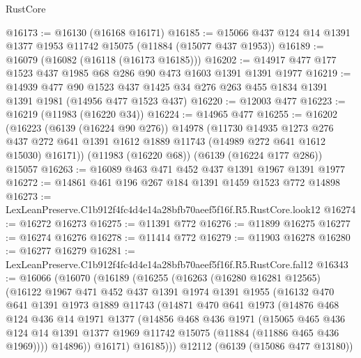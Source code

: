 \begin{lexlean}{RustCore}
\begin{coremodule}
@16173 := @16130 (@16168 @16171)
@16185 := @15066 @437 @124 @14 @1391 @1377 @1953 @11742 @15075 (@11884 (@15077 @437 @1953))
@16189 := @16079 (@16082 (@16118 (@16173 @16185)))
@16202 := @14917 @477 @177 @1523 @437 @1985 @68 @286 @90 @473 @1603 @1391 @1391 @1977
@16219 := @14939
    @477
    @90
    @1523
    @437
    @1425
    @34
    @276
    @263
    @455
    @1834
    @1391
    @1391
    @1981
    (@14956 @477 @1523 @437)
@16220 := @12003 @477
@16223 := @16219 (@11983 (@16220 @34))
@16224 := @14965 @477
@16255 := @16202
    (@16223
      (@6139 (@16224 @90 @276))
      @14978
      (@11730
        @14935
        @1273
        @276
        @437
        @272
        @641
        @1391
        @1612
        @1889
        @11743
        (@14989 @272 @641 @1612 @15030)
        @16171))
    (@11983 (@16220 @68))
    (@6139 (@16224 @177 @286))
    @15057
@16263 := @16089 @463 @471 @452 @437 @1391 @1967 @1391 @1977
@16272 := @14861 @461 @196 @267 @184 @1391 @1459 @1523 @772 @14898
@16273 := LexLeanPreserve.C1b912f4fc4d4e14a28bfb70aeef5f16f.R5.RustCore.look12
@16274 := @16272 @16273
@16275 := @11391 @772
@16276 := @11899 @16275
@16277 := @16274 @16276
@16278 := @11414 @772
@16279 := @11903 @16278
@16280 := @16277 @16279
@16281 := LexLeanPreserve.C1b912f4fc4d4e14a28bfb70aeef5f16f.R5.RustCore.fal12
@16343 := @16066
    (@16070
      (@16189
        (@16255
          (@16263
            (@16280 @16281 @12565)
            (@16122
              @1967
              @471
              @452
              @437
              @1391
              @1974
              @1391
              @1955
              (@16132
                @470
                @641
                @1391
                @1973
                @1889
                @11743
                (@14871
                  @470
                  @641
                  @1973
                  (@14876
                    @468
                    @124
                    @436
                    @14
                    @1971
                    @1377
                    (@14856
                      @468
                      @436
                      @1971
                      (@15065
                        @465
                        @436
                        @124
                        @14
                        @1391
                        @1377
                        @1969
                        @11742
                        @15075
                        (@11884 (@11886 @465 @436 @1969))))
                    @14896))
                @16171)
              @16185)))
        @12112
        (@6139 (@15086 @477 @13180))

\end{coremodule}
\end{lexlean}
